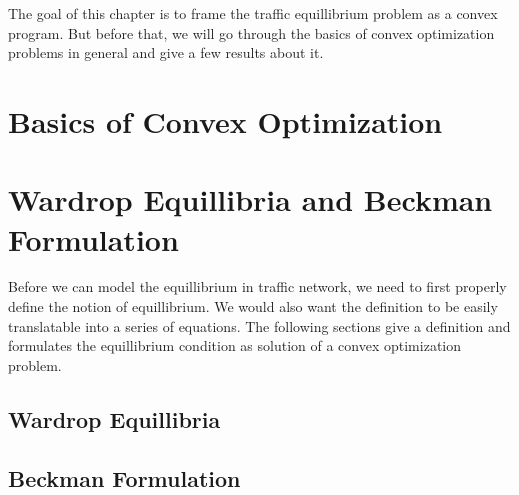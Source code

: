 The goal of this chapter is to  frame the traffic equillibrium problem
as a convex program. But before that, we will go through the basics of
convex optimization problems in general and give a few
results about it.


\section{Basics of Convex Optimization}


\section{Wardrop Equillibria and Beckman Formulation}
	Before we can model the equillibrium in traffic network, we need
	to first properly define the notion of equillibrium. We would also
	want the definition to be easily translatable into a series of
	equations. The following sections give a definition and
	formulates the equillibrium condition as solution of a
	convex optimization problem.

	\subsection{Wardrop Equillibria}
	
	

	\subsection{Beckman Formulation}\label{sec:beckman}
	
